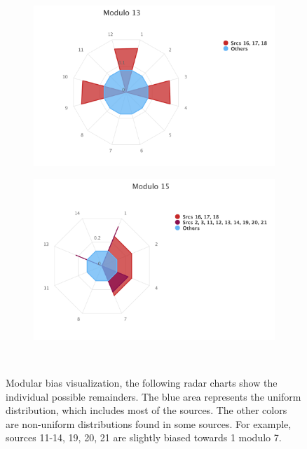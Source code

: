 \begin{figure}[ht]
\begin{adjustbox}{minipage=\linewidth,scale=0.8}
\begin{subfigure}{0.45\textwidth}
	\includegraphics[width=\linewidth]{tex/images/analysis/mod13}
\end{subfigure}
\hfill
\begin{subfigure}{0.45\textwidth}
	\includegraphics[width=\linewidth]{tex/images/analysis/mod15}
\end{subfigure}\\

\caption{Modular bias visualization, the following radar charts show the individual possible remainders. The blue area represents the uniform distribution, which includes most of the sources. The other colors are non-uniform distributions found in some sources. For example, sources 11-14, 19, 20, 21 are slightly biased towards 1 modulo 7.}
\end{adjustbox}
\end{figure}
\label{figure-mod-analysis}

